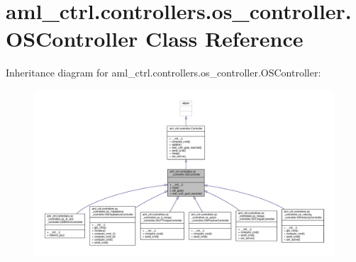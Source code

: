 \hypertarget{classaml__ctrl_1_1controllers_1_1os__controller_1_1_o_s_controller}{\section{aml\-\_\-ctrl.\-controllers.\-os\-\_\-controller.\-O\-S\-Controller Class Reference}
\label{classaml__ctrl_1_1controllers_1_1os__controller_1_1_o_s_controller}
}


Inheritance diagram for aml\-\_\-ctrl.\-controllers.\-os\-\_\-controller.\-O\-S\-Controller\-:
\nopagebreak
\begin{figure}[H]
\begin{center}
\leavevmode
\includegraphics[width=350pt]{classaml__ctrl_1_1controllers_1_1os__controller_1_1_o_s_controller__inherit__graph}
\end{center}
\end{figure}


